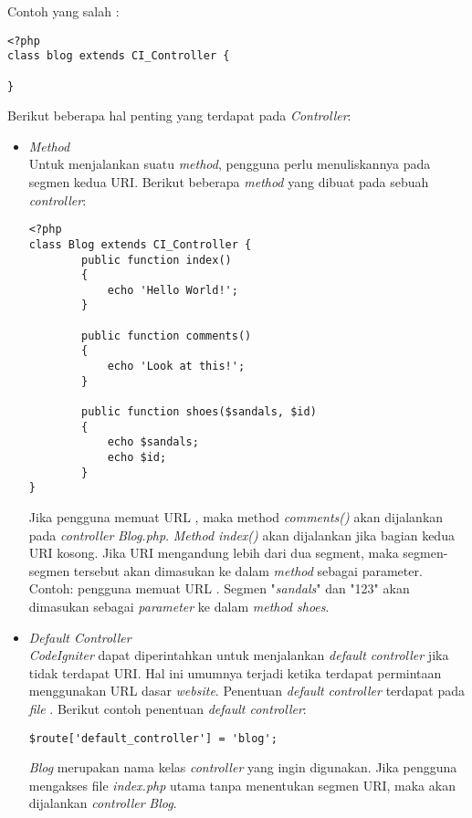 	Contoh yang salah :
\begin{lstlisting}[basicstyle=\ttfamily, frame=single,
columns=fullflexible, keepspaces=true, breaklines=true]
<?php
class blog extends CI_Controller {

}
\end{lstlisting} 

	Berikut beberapa hal penting yang terdapat pada \textit{Controller}:
	\begin{itemize}
		\item \textit{Method} \\
		Untuk menjalankan suatu \textit{method}, pengguna perlu menuliskannya pada segmen kedua URI. Berikut beberapa \textit{method} yang dibuat pada sebuah \textit{controller}:
\begin{lstlisting}[basicstyle=\ttfamily, frame=single,
columns=fullflexible, keepspaces=true, breaklines=true]
<?php
class Blog extends CI_Controller {
		public function index()
		{
			echo 'Hello World!';
		}
		
		public function comments()
		{
			echo 'Look at this!';
		}
		
		public function shoes($sandals, $id)
		{
			echo $sandals;
			echo $id;
		}
}
\end{lstlisting}
		Jika pengguna memuat URL , maka method \textit{comments()} akan dijalankan pada \textit{controller} \textit{Blog.php}. \textit{Method index()} akan dijalankan jika bagian kedua URI kosong. Jika URI mengandung lebih dari dua segment, maka segmen-segmen tersebut akan dimasukan ke dalam \textit{method} sebagai parameter. Contoh: pengguna memuat URL . Segmen "\textit{sandals}" dan "123" akan dimasukan sebagai \textit{parameter} ke dalam \textit{method shoes}.
		
		\item \textit{Default Controller} \\
		\textit{CodeIgniter} dapat diperintahkan untuk menjalankan \textit{default controller} jika tidak terdapat URI. Hal ini umumnya terjadi ketika terdapat permintaan menggunakan URL dasar \textit{website}. Penentuan \textit{default controller} terdapat pada \textit{file} . Berikut contoh penentuan \textit{default controller}:
\begin{lstlisting}[basicstyle=\ttfamily, frame=single,
columns=fullflexible, keepspaces=true, breaklines=true]
$route['default_controller'] = 'blog';
\end{lstlisting} 
		\textit{Blog} merupakan nama kelas \textit{controller} yang ingin digunakan. Jika pengguna mengakses file \textit{index.php} utama tanpa menentukan segmen URI, maka akan dijalankan \textit{controller} \textit{Blog}.
		

\end{itemize}
